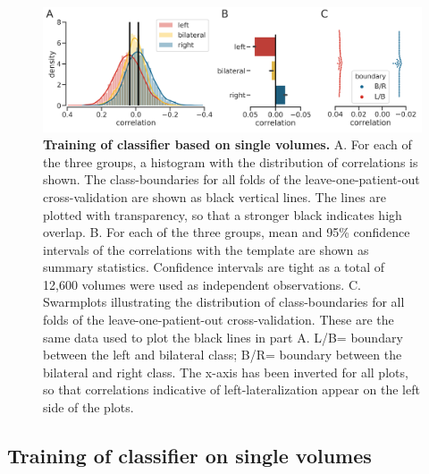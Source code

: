 \documentclass[fleqn,10pt]{SelfArx} %
\begin{document}
	\begin{figure}[htb]
		\begin{minipage}{\textwidth}
			\renewcommand{\familydefault}{\sfdefault}\normalfont
			\centering
			\includegraphics[width=0.95\columnwidth]{../reports/figures/10-training-overview.png}
			\caption{\textbf{Training of classifier based on single volumes.} 
				A. For each of the three groups, a histogram with the distribution of correlations is shown. The class-boundaries for all folds of the leave-one-patient-out cross-validation are shown as black vertical lines. The lines are plotted with transparency, so that a stronger black indicates high overlap.
				B. For each of the three groups, mean and 95\% confidence intervals of the correlations with the template are shown as summary statistics. Confidence intervals are tight as a total of 12,600 volumes were used as independent observations.
				C. Swarmplots illustrating the distribution of class-boundaries for all folds of the leave-one-patient-out cross-validation. These are the same data used to plot the black lines in part A. L/B= boundary between the left and bilateral class; B/R= boundary between the bilateral and right class.
				The x-axis has been inverted for all plots, so that correlations indicative of left-lateralization appear on the left side of the plots.}%
			\label{fig:training}
		\end{minipage}
	\end{figure}
	

\subsection{Training of classifier on single volumes} \label{Training of classifier on single volumes}
\end{document}
